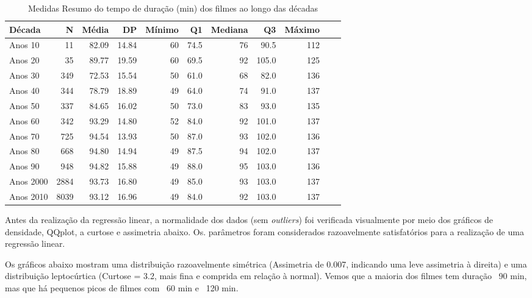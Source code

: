 \documentclass[a4paper, 12pt]{article} %
\begin{document}
\begin{table}[H]
\caption{Medidas Resumo do tempo de duração (min) dos filmes ao longo das décadas}
\centering
\begin{tabular}{l|rrrrrrrrrr}
\hline
\multicolumn{1}{l|}{\textbf{Década}} &
\multicolumn{1}{r}{\textbf{N}} &
\multicolumn{1}{r}{\textbf{Média}} &
\multicolumn{1}{r}{\textbf{DP}}&
\multicolumn{1}{r}{\textbf{Mínimo}}&
\multicolumn{1}{r}{\textbf{Q1}}&
\multicolumn{1}{r}{\textbf{Mediana}}&
\multicolumn{1}{r}{\textbf{Q3}}&
\multicolumn{1}{r}{\textbf{Máximo}}\\
\hline
Anos 10 & 11  & 82.09 & 14.84 & 60 & 74.5 & 76 & 90.5 & 112\\
Anos 20 & 35  & 89.77 & 19.59 & 60 & 69.5 & 92 & 105.0 & 125\\
Anos 30 & 349  & 72.53 & 15.54 & 50 & 61.0 & 68 & 82.0 & 136\\
Anos 40 & 344  & 78.79 & 18.89 & 49 & 64.0 & 74 & 91.0 & 137\\
Anos 50 & 337  & 84.65 & 16.02 & 50 & 73.0 & 83 & 93.0 & 135\\
Anos 60 & 342 & 93.29 & 14.80 & 52 & 84.0 & 92 & 101.0 & 137\\
Anos 70 & 725  & 94.54 & 13.93 & 50 & 87.0 & 93 & 102.0 & 136\\
Anos 80 & 668  & 94.80 & 14.94 & 49 & 87.5 & 94 & 102.0 & 137\\
Anos 90 & 948  & 94.82 & 15.88 & 49 & 88.0 & 95 & 103.0 & 136\\
Anos 2000 & 2884  & 93.73 & 16.80 & 49 & 85.0 & 93 & 103.0 & 137\\
Anos 2010 & 8039  & 93.12 & 16.96 & 49 & 84.0 & 92 & 103.0 & 137\\
\hline
\end{tabular}
\end{table}

Antes da realização da regressão linear, a normalidade dos dados (sem \emph{outliers}) foi verificada visualmente por meio dos gráficos de densidade, QQplot, a curtose e assimetria abaixo. Os. parâmetros foram considerados razoavelmente satisfatórios para a realização de uma regressão linear. 

Os gráficos abaixo mostram uma distribuição razoavelmente simétrica (Assimetria de 0.007, indicando uma leve assimetria à direita) e uma distribuição leptocúrtica (Curtose = 3.2, mais fina e comprida em relação à normal). Vemos que a maioria dos filmes tem duração ~90 min, mas que há pequenos picos de filmes com ~60 min e ~120 min.
\end{document}
